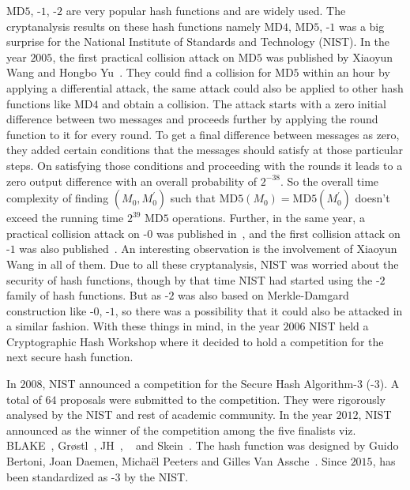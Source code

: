 MD$5$, \SHA-$1$, \SHA-$2$ are very popular hash functions and are widely used. The cryptanalysis results on these hash functions namely MD$4$, MD$5$, \SHA-$1$ was a big surprise for the National Institute of Standards and Technology (NIST). In the year $2005$, the first practical collision attack on MD$5$ was published by Xiaoyun Wang and Hongbo Yu~\cite{wang2005break}. They could find a collision for MD$5$ within an hour by applying a differential attack, the same attack could also be applied to other hash functions like MD$4$ and obtain a collision. The attack starts with a zero initial difference between two messages and proceeds further by applying the round function to it for every round. To get a final difference between messages as zero, they added certain conditions that the messages should satisfy at those particular steps. On satisfying those conditions and proceeding with the rounds it leads to a zero output difference with an overall probability of $2^{-38}$. So the overall time complexity of finding $(M_0, M^\prime_0)$ such that MD$5(M_0) = $MD$5(M^\prime_0)$ doesn't exceed the running time $2^{39}$ MD$5$ operations. Further, in the same year, a practical collision attack on \SHA-$0$ was published in~\cite{wang2005efficient}, and the first collision attack on \SHA-$1$ was also published~\cite{wang2005finding}.
 An interesting observation is the involvement of Xiaoyun Wang in all of them. Due to all these cryptanalysis, NIST was worried about the security of hash functions, though by that time NIST had started using the \SHA-$2$ family of hash functions. But as \SHA-$2$ was also based on Merkle-Damgard construction like \SHA-$0$, \SHA-$1$, so there was a possibility that it could also be attacked in a similar fashion. With these things in mind, in the year $2006$ NIST held a Cryptographic Hash Workshop where it decided to hold a competition for the next secure hash function.

In $2008$, NIST announced a competition for the Secure Hash Algorithm-$3$ (\SHA-$3$). A total of $64$ proposals were submitted to the competition. They were rigorously analysed by the NIST and rest of academic community.
 In the year $2012$, NIST announced \KECCAK{} as the winner of the competition among the five finalists viz. BLAKE~\cite{aumasson2008sha}, Gr\o stl~\cite{gauravaram2011s}, JH~\cite{wu2011hash}, \KECCAK{}~\cite{bertonikeccak} and Skein~\cite{fergusonskein}. The \KECCAK{} hash function was designed by Guido Bertoni, Joan Daemen, Micha\"{e}l Peeters and Gilles Van Assche~\cite{bertoni2009keccak}. Since $2015$, \KECCAK{} has been standardized as \SHA-$3$ by the NIST.

